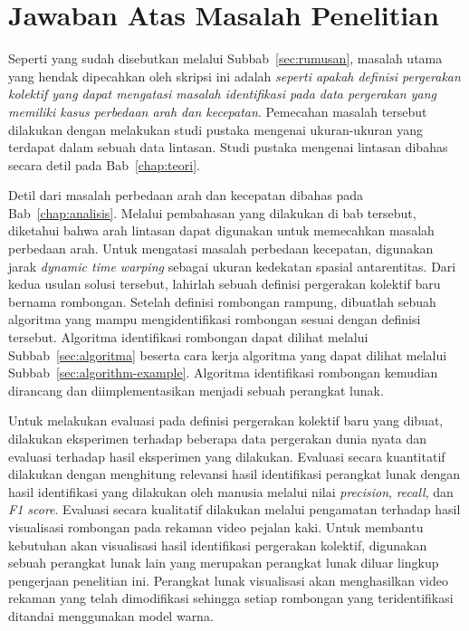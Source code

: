 \section{Jawaban Atas Masalah Penelitian}
\label{sec:jawaban-masalah}

Seperti yang sudah disebutkan melalui Subbab~\ref{sec:rumusan}, masalah utama yang hendak dipecahkan oleh skripsi ini adalah \textit{seperti apakah definisi pergerakan kolektif yang dapat mengatasi masalah identifikasi pada data pergerakan yang memiliki kasus perbedaan arah dan kecepatan}. Pemecahan masalah tersebut dilakukan dengan melakukan studi pustaka mengenai ukuran-ukuran yang terdapat dalam sebuah data lintasan. Studi pustaka mengenai lintasan dibahas secara detil pada Bab~\ref{chap:teori}.

Detil dari masalah perbedaan arah dan kecepatan dibahas pada Bab~\ref{chap:analisis}. Melalui pembahasan yang dilakukan di bab tersebut, diketahui bahwa arah lintasan dapat digunakan untuk memecahkan masalah perbedaan arah. Untuk mengatasi masalah perbedaan kecepatan, digunakan jarak \textit{dynamic time warping} sebagai ukuran kedekatan spasial antarentitas. Dari kedua usulan solusi tersebut, lahirlah sebuah definisi pergerakan kolektif baru bernama rombongan. Setelah definisi rombongan rampung, dibuatlah sebuah algoritma yang mampu mengidentifikasi rombongan sesuai dengan definisi tersebut. Algoritma identifikasi rombongan dapat dilihat melalui Subbab~\ref{sec:algoritma} beserta cara kerja algoritma yang dapat dilihat melalui Subbab~\ref{sec:algorithm-example}. Algoritma identifikasi rombongan kemudian dirancang dan diimplementasikan menjadi sebuah perangkat lunak.

Untuk melakukan evaluasi pada definisi pergerakan kolektif baru yang dibuat, dilakukan eksperimen terhadap beberapa data pergerakan dunia nyata dan evaluasi terhadap hasil eksperimen yang dilakukan. Evaluasi secara kuantitatif dilakukan dengan menghitung relevansi hasil identifikasi perangkat lunak dengan hasil identifikasi yang dilakukan oleh manusia melalui nilai \textit{precision}, \textit{recall}, dan \textit{F1 score}. Evaluasi secara kualitatif dilakukan melalui pengamatan terhadap hasil visualisasi rombongan pada rekaman video pejalan kaki. Untuk membantu kebutuhan akan visualisasi hasil identifikasi pergerakan kolektif, digunakan sebuah perangkat lunak lain yang merupakan perangkat lunak diluar lingkup pengerjaan penelitian ini. Perangkat lunak visualisasi akan menghasilkan video rekaman yang telah dimodifikasi sehingga setiap rombongan yang teridentifikasi ditandai menggunakan model warna.

